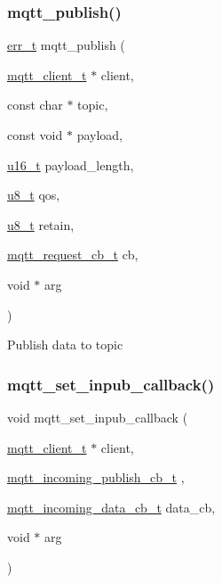 \subsubsection{\texorpdfstring{mqtt\+\_\+publish()}{mqtt\_publish()}}
{\footnotesize\ttfamily \hyperlink{group__infrastructure__errors_gaf02d9da80fd66b4f986d2c53d7231ddb}{err\+\_\+t} mqtt\+\_\+publish (\begin{DoxyParamCaption}\item[{\hyperlink{structmqtt__client__t}{mqtt\+\_\+client\+\_\+t} $\ast$}]{client,  }\item[{const char $\ast$}]{topic,  }\item[{const void $\ast$}]{payload,  }\item[{\hyperlink{group__compiler__abstraction_ga77570ac4fcab86864fa1916e55676da2}{u16\+\_\+t}}]{payload\+\_\+length,  }\item[{\hyperlink{group__compiler__abstraction_ga4caecabca98b43919dd11be1c0d4cd8e}{u8\+\_\+t}}]{qos,  }\item[{\hyperlink{group__compiler__abstraction_ga4caecabca98b43919dd11be1c0d4cd8e}{u8\+\_\+t}}]{retain,  }\item[{\hyperlink{group__mqtt_gacad2bbe2cee76eaa120cc63e2f6094fd}{mqtt\+\_\+request\+\_\+cb\+\_\+t}}]{cb,  }\item[{void $\ast$}]{arg }\end{DoxyParamCaption})}

Publish data to topic \mbox{\label{openmote-cc2538_2lwip_2src_2include_2lwip_2apps_2mqtt_8h_a1f165225a0aab027ba72b6077bc5dda0}} 
\subsubsection{\texorpdfstring{mqtt\+\_\+set\+\_\+inpub\+\_\+callback()}{mqtt\_set\_inpub\_callback()}}
{\footnotesize\ttfamily void mqtt\+\_\+set\+\_\+inpub\+\_\+callback (\begin{DoxyParamCaption}\item[{\hyperlink{structmqtt__client__t}{mqtt\+\_\+client\+\_\+t} $\ast$}]{client,  }\item[{\hyperlink{group__mqtt_ga7116bb85255394cec4b1d9fa38842c29}{mqtt\+\_\+incoming\+\_\+publish\+\_\+cb\+\_\+t}}]{,  }\item[{\hyperlink{group__mqtt_gafec7e75fe6a746eef9ca411463446c81}{mqtt\+\_\+incoming\+\_\+data\+\_\+cb\+\_\+t}}]{data\+\_\+cb,  }\item[{void $\ast$}]{arg }\end{DoxyParamCaption})}

